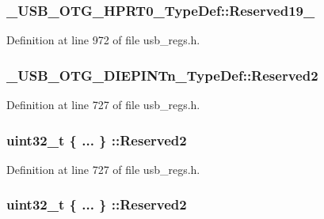 \hypertarget{group___u_s_b___o_t_g___d_r_i_v_e_r_ga985d93249d26d1bba1e829f325c55a40}{
\subsubsection[{Reserved19\-\_\-31}]{ \-\_\-\-U\-S\-B\-\_\-\-O\-T\-G\-\_\-\-H\-P\-R\-T0\-\_\-\-Type\-Def\-::\-Reserved19\-\_}}\label{group___u_s_b___o_t_g___d_r_i_v_e_r_ga985d93249d26d1bba1e829f325c55a40}


Definition at line 972 of file usb\-\_\-regs.\-h.

\hypertarget{group___u_s_b___o_t_g___d_r_i_v_e_r_ga651638e82db2efdf3fa0b9c653008668}{
\subsubsection[{Reserved2}]{ \-\_\-\-U\-S\-B\-\_\-\-O\-T\-G\-\_\-\-D\-I\-E\-P\-I\-N\-Tn\-\_\-\-Type\-Def\-::\-Reserved2}}\label{group___u_s_b___o_t_g___d_r_i_v_e_r_ga651638e82db2efdf3fa0b9c653008668}


Definition at line 727 of file usb\-\_\-regs.\-h.

\hypertarget{group___u_s_b___o_t_g___d_r_i_v_e_r_gaf068b18c662ead80ad08a96ba2dfb2d9}{
\subsubsection[{Reserved2}]{\setlength{\rightskip}{0pt plus 5cm}uint32\-\_\-t \{ ... \} \-::Reserved2}}\label{group___u_s_b___o_t_g___d_r_i_v_e_r_gaf068b18c662ead80ad08a96ba2dfb2d9}


Definition at line 727 of file usb\-\_\-regs.\-h.

\hypertarget{group___u_s_b___o_t_g___d_r_i_v_e_r_ga8882eaa7dd4efc3ab5087478b9a4cddd}{
\subsubsection[{Reserved2}]{\setlength{\rightskip}{0pt plus 5cm}uint32\-\_\-t \{ ... \} \-::Reserved2}}\label{group___u_s_b___o_t_g___d_r_i_v_e_r_ga8882eaa7dd4efc3ab5087478b9a4cddd}


